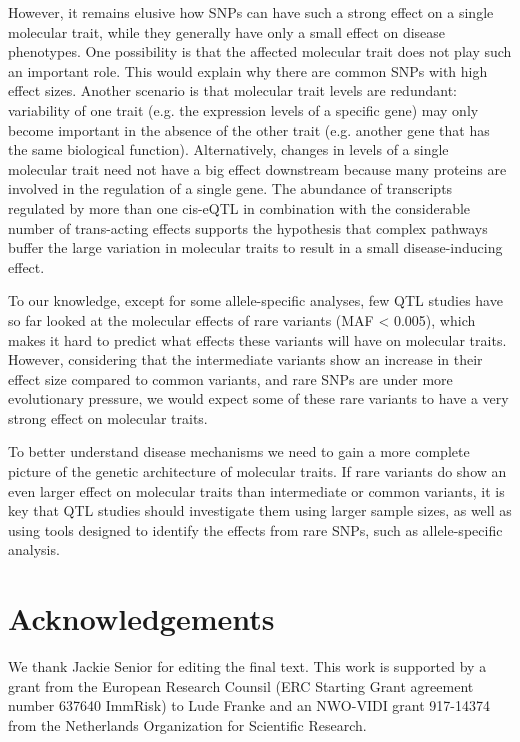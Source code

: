 However, it remains elusive how SNPs can have such a strong effect on a single molecular trait, while they generally have only a small effect on disease phenotypes. One possibility is that the affected molecular trait does not play such an important role. This would explain why there are common SNPs with high effect sizes. Another scenario is that molecular trait levels are redundant: variability of one trait (e.g. the expression levels of a specific gene) may only become important in the absence of the other trait (e.g. another gene that has the same biological function). Alternatively, changes in levels of a single molecular trait need not have a big effect downstream because many proteins are involved in the regulation of a single gene. The abundance of transcripts regulated by more than one cis-eQTL in combination with the considerable number of trans-acting effects supports the hypothesis that complex pathways buffer the large variation in molecular traits to result in a small disease-inducing effect.

To our knowledge, except for some allele-specific analyses, few QTL studies have so far looked at the molecular effects of rare variants (MAF < 0.005), which makes it hard to predict what effects these variants will have on molecular traits. However, considering that the intermediate variants show an increase in their effect size compared to common variants, and rare SNPs are under more evolutionary pressure, we would expect some of these rare variants to have a very strong effect on molecular traits.

To better understand disease mechanisms we need to gain a more complete picture of the genetic architecture of molecular traits. If rare variants do show an even larger effect on molecular traits than intermediate or common variants, it is key that QTL studies should investigate them using larger sample sizes, as well as using tools designed to identify the effects from rare SNPs, such as allele-specific analysis. 


\section*{Acknowledgements}
We thank Jackie Senior for editing the final text. This work is supported by a grant from the European Research Counsil (ERC Starting Grant agreement number 637640 ImmRisk) to Lude Franke and an NWO-VIDI grant 917-14374 from the Netherlands Organization for Scientific Research. 

